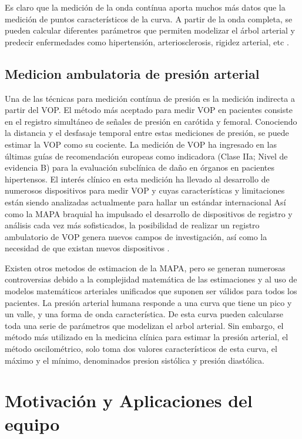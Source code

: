 Es claro que la medición de la onda contínua aporta muchos más datos que la medición de puntos característicos de la curva. A partir de la onda completa, se pueden calcular diferentes parámetros que permiten modelizar el árbol arterial y predecir enfermedades como hipertensión, arteriosclerosis, rigidez arterial, etc \citep{saito2011}  \citep{figueroa2014}.


\subsection{Medicion ambulatoria de presión arterial}

Una de las técnicas para medición contínua de presión es la medición indirecta a partir del VOP. El método más aceptado para medir VOP en pacientes consiste en el registro simultáneo de señales de presión en carótida y femoral. Conociendo la distancia y el desfasaje temporal entre estas mediciones de presión, se puede estimar la VOP como su cociente. La medición de VOP ha ingresado en las últimas guías de recomendación europeas como indicadora (Clase IIa; Nivel de evidencia B) para la evaluación subclínica de daño en órganos en pacientes hipertensos. El interés clínico en esta medición ha llevado al desarrollo de numerosos dispositivos para medir VOP y cuyas características y limitaciones están siendo analizadas actualmente para hallar un estándar internacional \citep{laurent2006} Así como la MAPA braquial ha impulsado el desarrollo de dispositivos de registro y análisis cada vez más sofisticados, la posibilidad de realizar un registro ambulatorio de VOP genera nuevos campos de investigación, así como la necesidad de que existan nuevos dispositivos \citep{omboni2016}.


Existen otros metodos de estimacion de la MAPA, pero se generan numerosas controversias debido a la complejidad matemática de las estimaciones y al uso de modelos matemáticos  arteriales unificados que suponen ser válidos para todos los pacientes. 
La presión arterial humana responde a una curva que tiene un pico y un valle, y una forma de onda característica. De esta curva pueden calcularse toda una serie de parámetros que modelizan el arbol arterial. Sin embargo, el método más utilizado en la medicina clínica para estimar la presión arterial, el método oscilométrico, solo toma dos valores característicos de esta curva, el máximo y el mínimo, denominados presion sistólica y presión diastólica.

\section{Motivación y Aplicaciones del equipo}

